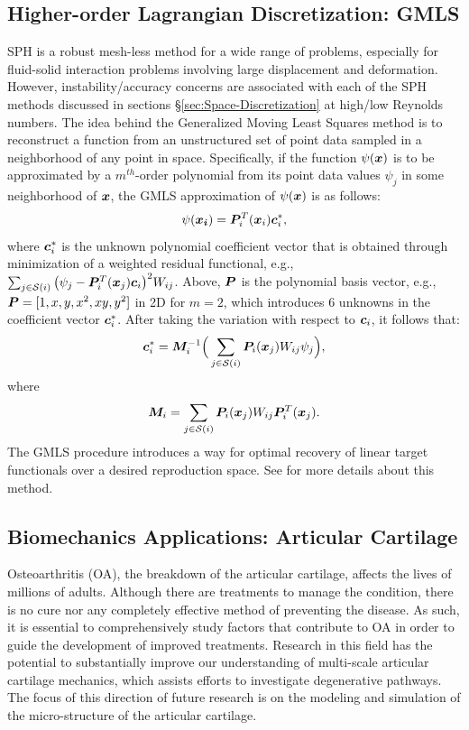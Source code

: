 \subsection{Higher-order Lagrangian Discretization: GMLS}
SPH is a robust mesh-less method for a wide range of problems, especially for fluid-solid interaction problems involving large displacement and deformation. However, instability/accuracy concerns are associated with each of the SPH methods discussed in sections \S\ref{sec:Space-Discretization} at high/low Reynolds numbers. 
The idea behind the Generalized Moving Least Squares method is to reconstruct a function from an unstructured set of point data sampled in a neighborhood of any point in space. Specifically, if the function $\psi(\boldsymbol{x})$ is to be approximated by a $m^{th}$-order polynomial from its point data values $\psi_j$ in some neighborhood of $\boldsymbol{x}$, the GMLS approximation of $\psi(\boldsymbol{x})$ is as follows:
\begin{equation}
\psi(\boldsymbol{x_i})=\boldsymbol{P}^T_i(\boldsymbol{x}_i) \boldsymbol{c}^*_i,
\end{equation}
where $\boldsymbol{c}^*_i$ is the unknown polynomial coefficient vector that is obtained through minimization of a weighted residual functional, e.g., $\sum_{j \in {{\mathcal{S}({i})}}} \big(\psi_j - \boldsymbol{P}^T_i(\boldsymbol{x}_j) \boldsymbol{c}_i\big)^2W_{ij}$. Above, $\boldsymbol{P}$ is the polynomial basis vector, e.g., $\boldsymbol{P}=[1,x,y,x^2,xy,y^2]$ in 2D for $m=2$, which introduces 6 unknowns in the coefficient vector $\boldsymbol{c}^*_i$. After taking the variation with respect to $\boldsymbol{c}_i$, it follows that:
\begin{equation}
\boldsymbol{c}^{*}_{i}= \boldsymbol{M}_i^{-1}\Big( \sum_{j \in {{\mathcal{S}({i})}}} \boldsymbol{P}_i(\boldsymbol{x}_j) W_{ij}  \psi_j \Big), 
\end{equation}
where 
\begin{equation}
\boldsymbol{M}_i=  \sum_{j \in {{\mathcal{S}({i})}}}  \boldsymbol{P}_i(\boldsymbol{x}_j) W_{ij}  \boldsymbol{P}^T_i(\boldsymbol{x}_j).
\end{equation}
The GMLS procedure introduces a way for optimal recovery of linear target functionals over a desired reproduction space. See \cite{hu2019spatially, trask2016compact} for more details about this method.
 
\subsection{Biomechanics Applications: Articular Cartilage}
Osteoarthritis (OA), the breakdown of the articular cartilage, affects the lives of millions of adults. Although there are treatments to manage the condition, there is no cure nor any completely effective method of preventing the disease. As such, it is essential to comprehensively study factors that contribute to OA in order to guide the development of improved treatments. Research in this field has the potential to substantially improve our understanding of multi-scale articular cartilage mechanics, which assists efforts to investigate degenerative pathways. The focus of this direction of future research is  on the modeling and simulation of the micro-structure of the articular cartilage. 

